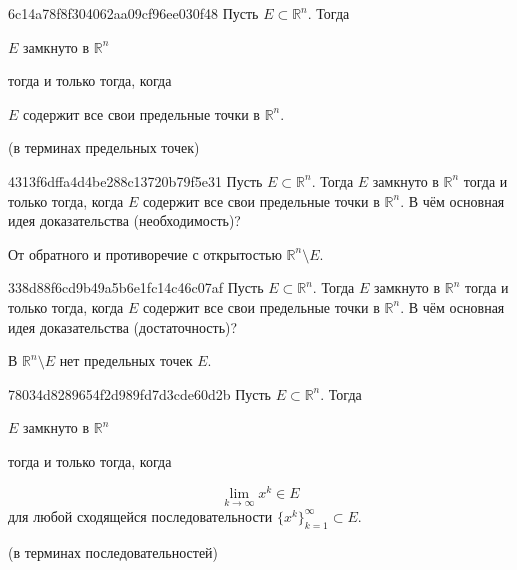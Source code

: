 \begin{note}{6c14a78f8f304062aa09cf96ee030f48}
    Пусть \({ E \subset \mathbb R^{n} }\).
    Тогда \begin{icloze}{2}\({ E }\) замкнуто в \({ \mathbb R^{n} }\)\end{icloze} \begin{icloze}{3}тогда и только тогда, когда\end{icloze} \begin{icloze}{1}\({ E }\) содержит все свои предельные точки в \({ \mathbb R^{n} }\).\end{icloze}

    \begin{center}
        \tiny (в терминах предельных точек)
    \end{center}
\end{note}

\begin{note}{4313f6dffa4d4be288c13720b79f5e31}
    Пусть \({ E \subset \mathbb R^{n} }\).
    Тогда \({ E }\) замкнуто в \({ \mathbb R^{n} }\) тогда и только тогда, когда \({ E }\) содержит все свои предельные точки в \({ \mathbb R^{n} }\).
    В чём основная идея доказательства (необходимость)?

    \begin{cloze}{1}
        От обратного и противоречие с открытостью \({ \mathbb R^{n} \setminus E }\).
    \end{cloze}
\end{note}

\begin{note}{338d88f6cd9b49a5b6e1fc14c46c07af}
    Пусть \({ E \subset \mathbb R^{n} }\).
    Тогда \({ E }\) замкнуто в \({ \mathbb R^{n} }\) тогда и только тогда, когда \({ E }\) содержит все свои предельные точки в \({ \mathbb R^{n} }\).
    В чём основная идея доказательства (достаточность)?

    \begin{cloze}{1}
        В \({ \mathbb R^{n} \setminus E }\) нет предельных точек \({ E }\).
    \end{cloze}
\end{note}

\begin{note}{78034d8289654f2d989fd7d3cde60d2b}
    Пусть \({ E \subset \mathbb R^{n} }\).
    Тогда \begin{icloze}{2}\({ E }\) замкнуто в \({ \mathbb R^{n} }\)\end{icloze} \begin{icloze}{3}тогда и только тогда, когда\end{icloze}
    \begin{icloze}{1}
        \[
            \lim_{k \to \infty} x^{k} \in E
        \]
        для любой сходящейся последовательности \({ \{ x^{k} \}_{k = 1}^{\infty} \subset E }\).
    \end{icloze}

    \begin{center}
        \tiny (в терминах последовательностей)
    \end{center}
\end{note}

